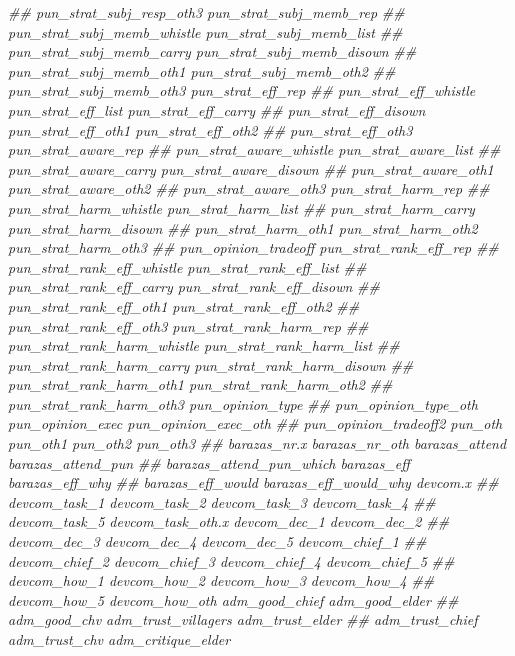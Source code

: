 \documentclass[
]{article}
\newenvironment{Shaded}{\begin{snugshade}}{\end{snugshade}}
\newcommand{\CommentTok}[1]{\textcolor[rgb]{0.56,0.35,0.01}{\textit{#1}}}
\begin{document}
\begin{Shaded}
\begin{Highlighting}[]
\CommentTok{##      pun_strat_subj_resp_oth3 pun_strat_subj_memb_rep}
\CommentTok{##      pun_strat_subj_memb_whistle pun_strat_subj_memb_list}
\CommentTok{##      pun_strat_subj_memb_carry pun_strat_subj_memb_disown}
\CommentTok{##      pun_strat_subj_memb_oth1 pun_strat_subj_memb_oth2}
\CommentTok{##      pun_strat_subj_memb_oth3 pun_strat_eff_rep}
\CommentTok{##      pun_strat_eff_whistle pun_strat_eff_list pun_strat_eff_carry}
\CommentTok{##      pun_strat_eff_disown pun_strat_eff_oth1 pun_strat_eff_oth2}
\CommentTok{##      pun_strat_eff_oth3 pun_strat_aware_rep}
\CommentTok{##      pun_strat_aware_whistle pun_strat_aware_list}
\CommentTok{##      pun_strat_aware_carry pun_strat_aware_disown}
\CommentTok{##      pun_strat_aware_oth1 pun_strat_aware_oth2}
\CommentTok{##      pun_strat_aware_oth3 pun_strat_harm_rep}
\CommentTok{##      pun_strat_harm_whistle pun_strat_harm_list}
\CommentTok{##      pun_strat_harm_carry pun_strat_harm_disown}
\CommentTok{##      pun_strat_harm_oth1 pun_strat_harm_oth2 pun_strat_harm_oth3}
\CommentTok{##      pun_opinion_tradeoff pun_strat_rank_eff_rep}
\CommentTok{##      pun_strat_rank_eff_whistle pun_strat_rank_eff_list}
\CommentTok{##      pun_strat_rank_eff_carry pun_strat_rank_eff_disown}
\CommentTok{##      pun_strat_rank_eff_oth1 pun_strat_rank_eff_oth2}
\CommentTok{##      pun_strat_rank_eff_oth3 pun_strat_rank_harm_rep}
\CommentTok{##      pun_strat_rank_harm_whistle pun_strat_rank_harm_list}
\CommentTok{##      pun_strat_rank_harm_carry pun_strat_rank_harm_disown}
\CommentTok{##      pun_strat_rank_harm_oth1 pun_strat_rank_harm_oth2}
\CommentTok{##      pun_strat_rank_harm_oth3 pun_opinion_type}
\CommentTok{##      pun_opinion_type_oth pun_opinion_exec pun_opinion_exec_oth}
\CommentTok{##      pun_opinion_tradeoff2 pun_oth pun_oth1 pun_oth2 pun_oth3}
\CommentTok{##      barazas_nr.x barazas_nr_oth barazas_attend barazas_attend_pun}
\CommentTok{##      barazas_attend_pun_which barazas_eff barazas_eff_why}
\CommentTok{##      barazas_eff_would barazas_eff_would_why devcom.x}
\CommentTok{##      devcom_task_1 devcom_task_2 devcom_task_3 devcom_task_4}
\CommentTok{##      devcom_task_5 devcom_task_oth.x devcom_dec_1 devcom_dec_2}
\CommentTok{##      devcom_dec_3 devcom_dec_4 devcom_dec_5 devcom_chief_1}
\CommentTok{##      devcom_chief_2 devcom_chief_3 devcom_chief_4 devcom_chief_5}
\CommentTok{##      devcom_how_1 devcom_how_2 devcom_how_3 devcom_how_4}
\CommentTok{##      devcom_how_5 devcom_how_oth adm_good_chief adm_good_elder}
\CommentTok{##      adm_good_chv adm_trust_villagers adm_trust_elder}
\CommentTok{##      adm_trust_chief adm_trust_chv adm_critique_elder}

\end{Highlighting}
\end{Shaded}
\end{document}
